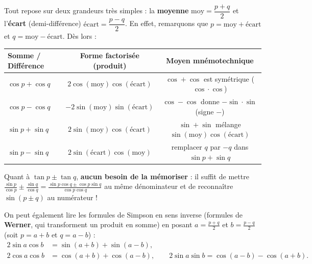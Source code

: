 \begin{astuce}
Tout repose sur deux grandeurs très simples : la \textbf{moyenne} $\text{moy} = \dfrac{p+q}{2}$ et l'\textbf{écart} (demi-différence) $\text{écart} = \dfrac{p-q}{2}$.
En effet, remarquons que $p = \text{moy} + \text{écart}$ et $q = \text{moy} - \text{écart}$. Dès lors :
\begin{center}
\renewcommand{\arraystretch}{1.35}
\small
\begin{tabular}{@{}lcc@{}}
\toprule
\textbf{Somme / Différence} & \textbf{Forme factorisée (produit)} & \textbf{Moyen mnémotechnique} \\
\midrule
$\cos p + \cos q$ & $2\cos(\text{moy})\cos(\text{écart})$ & $\cos + \cos$ est symétrique ($\cos\cdot\cos$) \\
$\cos p - \cos q$ & $-2\sin(\text{moy})\sin(\text{écart})$ & $\cos - \cos$ donne $-\sin\cdot\sin$ (signe $-$) \\
$\sin p + \sin q$ & $2\sin(\text{moy})\cos(\text{écart})$ & $\sin + \sin$ mélange $\sin(\text{moy})\cos(\text{écart})$ \\
$\sin p - \sin q$ & $2\sin(\text{écart})\cos(\text{moy})$ & remplacer $q$ par $-q$ dans $\sin p + \sin q$ \\
\bottomrule
\end{tabular}
\end{center}
Quant à $\tan p \pm \tan q$, \textbf{aucun besoin de la mémoriser} : il suffit de mettre $\frac{\sin p}{\cos p} \pm \frac{\sin q}{\cos q} = \frac{\sin p \cos q \pm \cos p \sin q}{\cos p \cos q}$ au même dénominateur et de reconnaître $\sin(p \pm q)$ au numérateur !
\end{astuce}

On peut également lire les formules de Simpson en sens inverse (formules de \textbf{Werner}, qui transforment un produit en somme) en posant $a = \frac{p+q}{2}$ et $b = \frac{p-q}{2}$ (soit $p = a+b$ et $q = a-b$) :
\begin{align*}
    2\sin a \cos b &= \sin(a+b) + \sin(a-b), \\
    2\cos a \cos b &= \cos(a+b) + \cos(a-b), \qquad 2\sin a \sin b = \cos(a-b) - \cos(a+b).
\end{align*}

